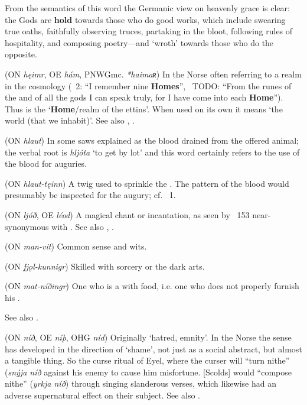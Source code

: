 \begin{itemize}
  From the semantics of this word the Germanic view on heavenly grace is clear: the Gods are \textbf{hold} towards those who do good works, which include swearing true oaths, faithfully observing truces, partaking in the bloot, following rules of hospitality, and composing poetry—and  ‘wroth’ towards those who do the opposite.

 (ON \emph{hęimr}, OE \emph{hám}, PNWGmc. \emph{*haimaʀ})
  In the Norse often referring to a realm in the cosmology (\Voluspa\ 2: “I remember nine \textbf{Homes}”, \Vafthrudnismal\ TODO: “From the runes of the  and of all the gods I can speak truly, for I have come into each \textbf{Home}”). Thus  is the ‘\textbf{Home}/realm of the ettins’. When used on its own it means ‘the world (that we inhabit)’. See also , .

 (ON \emph{hlaut})
  In some saws explained as the blood drained from the offered animal; the verbal root is \emph{hljóta} ‘to get by lot’ and this word certainly refers to the use of the blood for auguries.

 (ON \emph{hlaut-tęinn})
  A twig used to sprinkle the .  The pattern of the blood would presumably be inspected for the augury; cf. \Hymiskvida\ 1.

 (ON \emph{ljóð}, OE \emph{léod})
  A magical chant or incantation, as seen by \Havamal\ 153 near-synonymous with .  See also , .

 (ON \emph{man-vit})
  Common sense and wits.

 (ON \emph{fjǫl-kunnigr})
  Skilled with sorcery or the dark arts.

 (ON \emph{mat-níðingr})
  One who is a  with food, i.e. one who does not properly furnish his .

  See also .

 (ON \emph{níð}, OE \emph{níþ}, OHG \emph{níd})
  Originally ‘hatred, emnity’.  In the Norse the sense has developed in the direction of ‘shame’, not just as a social abstract, but almost a tangible thing.  So the curse ritual of Eyel, where the curser will “turn nithe” (\emph{snýja níð} against his enemy to cause him misfortune.  [Scolds] would “compose nithe” (\emph{yrkja níð}) through singing slanderous verses, which likewise had an adverse supernatural effect on their subject.  See also .


\end{itemize}
